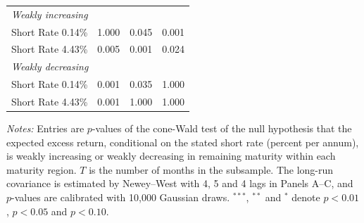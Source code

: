 \begin{table}[!htbp]
\begin{tabular}{lccc}
\multicolumn{4}{l}{\quad\textit{Weakly increasing}} \\
\qquad Short Rate 0.14\% & 1.000 & 0.045\rlap{$^{**}$} & \llap{$<$\,}0.001\rlap{$^{***}$} \\
\qquad Short Rate 4.43\% & 0.005\rlap{$^{***}$} & \llap{$<$\,}0.001\rlap{$^{***}$} & 0.024\rlap{$^{**}$} \\
\multicolumn{4}{l}{\quad\textit{Weakly decreasing}} \\
\qquad Short Rate 0.14\% & \llap{$<$\,}0.001\rlap{$^{***}$} & 0.035\rlap{$^{**}$} & 1.000 \\
\qquad Short Rate 4.43\% & \llap{$<$\,}0.001\rlap{$^{***}$} & 1.000 & 1.000 \\
\bottomrule
\end{tabular}
\par\medskip
\begin{minipage}{\linewidth}
\footnotesize\textit{Notes:} Entries are $p$-values of the cone-Wald test of the null hypothesis that the expected excess return, conditional on the stated short rate (percent per annum), is weakly increasing or weakly decreasing in remaining maturity within each maturity region. $T$ is the number of months in the subsample. The long-run covariance is estimated by Newey--West with 4, 5 and 4 lags in Panels A--C, and $p$-values are calibrated with 10,000 Gaussian draws. $^{***}$, $^{**}$ and $^{*}$ denote $p < 0.01$, $p < 0.05$ and $p < 0.10$.
\end{minipage}
\end{table}
